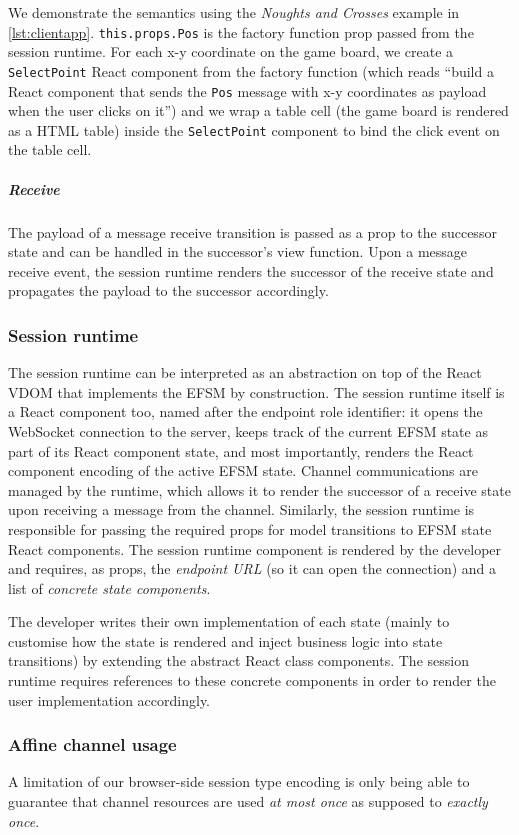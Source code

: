 We demonstrate the semantics using the \textit{Noughts and Crosses} example in
\cref{lst:clientapp}.
\texttt{this.props.Pos} is the factory function prop
passed from the session runtime.
For each x-y coordinate on the game board, we
create a \texttt{SelectPoint} React component from the factory function (which
reads ``build a React component that sends the \texttt{Pos} message with x-y
coordinates as payload when the user clicks on it'') and we wrap a table cell
(the game board is rendered as a HTML table) inside the \texttt{SelectPoint}
component to bind the click event on the table cell.

\subparagraph{Receive}
The payload of a message receive transition is passed as
a prop to the successor state and can be handled in the successor's view
function.
Upon a message receive event, the session runtime renders the
successor of the receive state and propagates the payload to the successor
accordingly.

\subsubsection{Session runtime}
\label{section:clientruntime}

The session runtime can be interpreted as an abstraction on top of the React
VDOM that implements the EFSM by construction.
The session runtime itself is a React component too, named after the endpoint
role identifier:
it opens the WebSocket connection to the server, keeps track of the current
EFSM state as part of its React component state, and most importantly, renders
the React component encoding of the active EFSM state.
Channel communications are managed by the runtime, which allows it to render
the successor of a receive state upon receiving a message from the channel.
Similarly, the session runtime is responsible for passing the required props
for model transitions to EFSM state React components.
The session runtime component is rendered by the developer and requires, as
props, the \textit{endpoint URL} (so it can open the connection) and a list of
\textit{concrete state components}.

The developer writes their own implementation of each state (mainly to
customise how the state is rendered and inject business logic into state
transitions) by extending the abstract React class components.
The session runtime requires references to these concrete components in order to
render the user implementation accordingly.

\subsubsection{Affine channel usage}
A limitation of our browser-side session type encoding is only being able to
guarantee that channel resources are used \textit{at most once} as supposed to
\textit{exactly once}.

